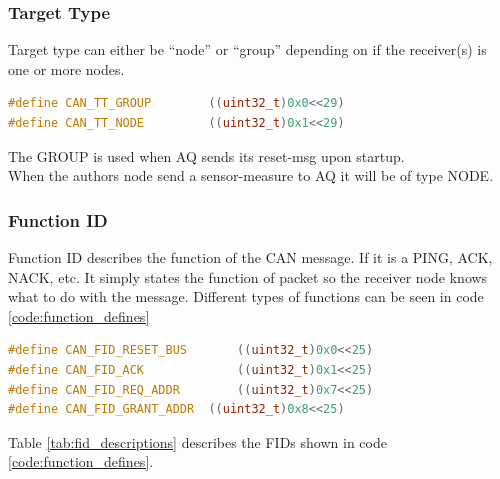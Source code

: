 \subsubsection{Target Type}
Target type can either be “node” or “group” depending on if the receiver(s) is one or more nodes. 
\begin{lstlisting}[language = c, caption = Target type defined in AQ, label=code:target_types]
#define CAN_TT_GROUP        ((uint32_t)0x0<<29)
#define CAN_TT_NODE         ((uint32_t)0x1<<29)
\end{lstlisting}
The GROUP is used when AQ sends its reset-msg upon startup.\\
When the authors node send a sensor-measure to AQ it will be of type NODE.
\subsubsection{Function ID}

Function ID describes the function of the CAN message. If it is a PING, ACK, NACK, etc.
It simply states the function of packet so the receiver node knows what to do with the message.
Different types of functions can be seen in code \ref{code:function_defines}
\begin{lstlisting}[language = c, caption = Excerpts from AQ's list of function defines, label=code:function_defines]
#define CAN_FID_RESET_BUS		((uint32_t)0x0<<25)
#define CAN_FID_ACK				((uint32_t)0x1<<25)
#define CAN_FID_REQ_ADDR		((uint32_t)0x7<<25)
#define CAN_FID_GRANT_ADDR	((uint32_t)0x8<<25)
\end{lstlisting}

Table \ref{tab:fid_descriptions} describes the FIDs shown in code \ref{code:function_defines}.
\begin{table}[H]
\centering
\caption{Descriptions of the FIDs mentioned in code \ref{code:function_defines}}
\label{tab:fid_descriptions}
\end{table}
